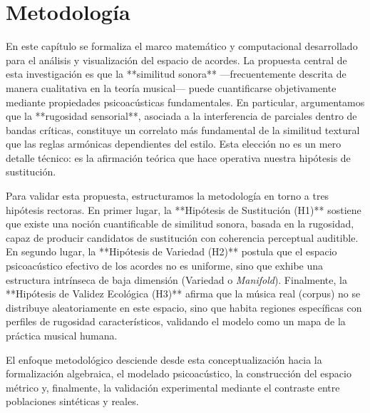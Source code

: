\chapter{Metodología}
\label{chap:metodologia}

En este capítulo se formaliza el marco matemático y computacional desarrollado para el análisis y visualización del espacio de acordes. La propuesta central de esta investigación es que la **similitud sonora** —frecuentemente descrita de manera cualitativa en la teoría musical— puede cuantificarse objetivamente mediante propiedades psicoacústicas fundamentales. En particular, argumentamos que la **rugosidad sensorial**, asociada a la interferencia de parciales dentro de bandas críticas, constituye un correlato más fundamental de la similitud textural que las reglas armónicas dependientes del estilo. Esta elección no es un mero detalle técnico: es la afirmación teórica que hace operativa nuestra hipótesis de sustitución.

Para validar esta propuesta, estructuramos la metodología en torno a tres hipótesis rectoras. En primer lugar, la **Hipótesis de Sustitución (H1)** sostiene que existe una noción cuantificable de similitud sonora, basada en la rugosidad, capaz de producir candidatos de sustitución con coherencia perceptual auditible. En segundo lugar, la **Hipótesis de Variedad (H2)** postula que el espacio psicoacústico efectivo de los acordes no es uniforme, sino que exhibe una estructura intrínseca de baja dimensión (Variedad o \textit{Manifold}). Finalmente, la **Hipótesis de Validez Ecológica (H3)** afirma que la música real (corpus) no se distribuye aleatoriamente en este espacio, sino que habita regiones específicas con perfiles de rugosidad característicos, validando el modelo como un mapa de la práctica musical humana.

El enfoque metodológico desciende desde esta conceptualización hacia la formalización algebraica, el modelado psicoacústico, la construcción del espacio métrico y, finalmente, la validación experimental mediante el contraste entre poblaciones sintéticas y reales.

